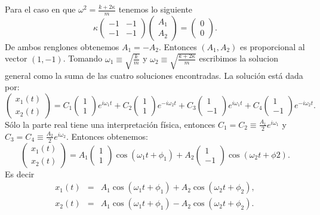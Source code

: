 \documentclass[letterpaper,12pt,oneside]{book}
\begin{document}
Para el caso en que $\omega ^2 = \frac{k + 2\kappa}{m}$ tenemos lo siguiente
%
\[\kappa \begin{pmatrix}
-1 & -1\\
-1 & -1
\end{pmatrix} \begin{pmatrix}
A_1\\
A_2
\end{pmatrix} = \begin{pmatrix}
0\\
0
\end{pmatrix}.\]
%
De ambos renglones obtenemos $A_1 = -A_2$. Entonces $(A_1, A_2)$ es proporcional al vector $(1,-1)$. Tomando $\omega_1 \equiv  \sqrt{\frac{k}{m}}$ y $\omega_2 \equiv \sqrt{\frac{k + 2\kappa}{m}}$ escribimos la solucion general como la suma de las cuatro soluciones encontradas. La soluci\'on est\'a
 dada por:
\[\begin{pmatrix}
x_1(t)\\
x_2(t)
\end{pmatrix} = C_1 \begin{pmatrix}
1 \\
1
\end{pmatrix}e^{i\omega_1 t} + C_2 \begin{pmatrix}
1\\
1
\end{pmatrix}e^{-i\omega_2 t}+ C_3 \begin{pmatrix}
1\\
-1
\end{pmatrix}e^{i\omega_1 t}+ C_4 \begin{pmatrix}
1\\
-1
\end{pmatrix}e^{-i\omega_2 t} .\]
%
S\'olo la parte real tiene una interpretaci\'on f\'isica, entonces $C_1 = C_2 \equiv \frac{A_1}{2}e^{i\omega_1}$ y $C_3 = C_4 \equiv \frac{A_2}{2}e^{i\omega_2}$. Entonces obtenemos:\\
%
 \[\begin{pmatrix}
x_1(t)\\
x_2(t)
\end{pmatrix} = A_1 \begin{pmatrix}
1 \\
1
\end{pmatrix}\cos(\omega_1 t + \phi_1) + A_2 \begin{pmatrix}
1\\
-1
\end{pmatrix}\cos(\omega_2 t + \phi2).\]
%
Es decir
%
\begin{eqnarray}
x_1(t)&=&A_1 \cos(\omega_1 t + \phi_1) + A_2 \cos(\omega_2t+\phi_2)\nonumber, \\
x_2(t)&=&A_1 \cos(\omega_1 t + \phi_1) - A_2 \cos(\omega_2t+\phi_2)\label{sol2masas}.
\end{eqnarray}
% 
\end{document}
